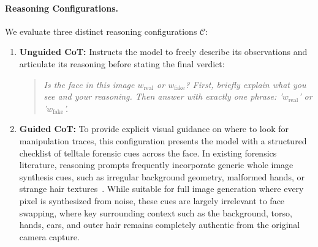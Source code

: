 \paragraph{Reasoning Configurations.}
We evaluate three distinct reasoning configurations $\mathcal{C}$:
\begin{enumerate}
    \item \textbf{Unguided CoT:} Instructs the model to freely describe its observations and articulate its reasoning before stating the final verdict:
    \begin{quote}
        \emph{Is the face in this image $w_{\text{real}}$ or $w_{\text{fake}}$? First, briefly explain what you see and your reasoning. Then answer with exactly one phrase: '$w_{\text{real}}$' or '$w_{\text{fake}}$'.}
    \end{quote}
    \item \textbf{Guided CoT:} To provide explicit visual guidance on where to look for manipulation traces, this configuration presents the model with a structured checklist of telltale forensic cues across the face. In existing forensics literature, reasoning prompts frequently incorporate generic whole image synthesis cues, such as irregular background geometry, malformed hands, or strange hair textures~\cite{jia2024can}. While suitable for full image generation where every pixel is synthesized from noise, these cues are largely irrelevant to face swapping, where key surrounding context such as the background, torso, hands, ears, and outer hair remains completely authentic from the original camera capture.
    

\end{enumerate}
